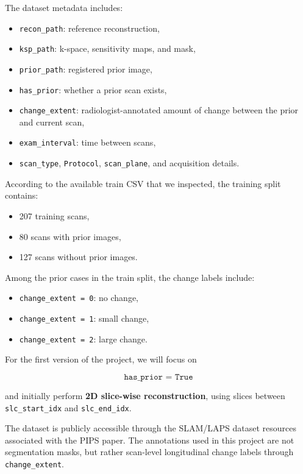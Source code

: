 \documentclass[11pt,a4paper]{article}
\begin{document}
The dataset metadata includes:

\begin{itemize}
    \item \texttt{recon\_path}: reference reconstruction,
    \item \texttt{ksp\_path}: k-space, sensitivity maps, and mask,
    \item \texttt{prior\_path}: registered prior image,
    \item \texttt{has\_prior}: whether a prior scan exists,
    \item \texttt{change\_extent}: radiologist-annotated amount of change between the prior and current scan,
    \item \texttt{exam\_interval}: time between scans,
    \item \texttt{scan\_type}, \texttt{Protocol}, \texttt{scan\_plane}, and acquisition details.
\end{itemize}

According to the available train CSV that we inspected, the training split contains:

\begin{itemize}
    \item 207 training scans,
    \item 80 scans with prior images,
    \item 127 scans without prior images.
\end{itemize}

Among the prior cases in the train split, the change labels include:

\begin{itemize}
    \item \texttt{change\_extent = 0}: no change,
    \item \texttt{change\_extent = 1}: small change,
    \item \texttt{change\_extent = 2}: large change.
\end{itemize}

For the first version of the project, we will focus on

\begin{equation}
\texttt{has\_prior = True}
\end{equation}

and initially perform \textbf{2D slice-wise reconstruction}, using slices between \texttt{slc\_start\_idx} and \texttt{slc\_end\_idx}.  

The dataset is publicly accessible through the SLAM/LAPS dataset resources associated with the PIPS paper. The annotations used in this project are not segmentation masks, but rather scan-level longitudinal change labels through \texttt{change\_extent}.
\end{document}
